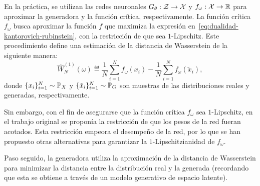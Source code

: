 {{En la práctica, se utilizan las redes neuronales $G_\theta: \mathcal{Z} \to \mathcal{X}$ y $f_\omega: \mathcal{X} \to \mathbb{R}$ para aproximar la generadora y la función crítica, respectivamente. La función crítica $f_\omega$ busca aproximar la función $f$ que maximiza la expresión en~\eqref{eq:dualidad-kantorovich-rubinstein}, con la restricción de que sea $1$-Lipschitz. Este procedimiento define una estimación de la distancia de Wasserstein de la siguiente manera:
\begin{equation}\label{eq:wasserstein-estimation}
    \widehat W_N^{(1)} (
    \omega
    ) \eqdef
    \frac{1}{N}\sum_{i=1}^{N} f_\omega(x_i) - \frac{1}{N}\sum_{i=1}^{N} f_\omega(\tilde x_i),
\end{equation}
donde $\{x_i\}_{i=1}^{N} \sim \Prob_X$ y $\{\tilde x_i\}_{i=1}^{N} \sim \Prob_G$ son muestras de las distribuciones reales y generadas, respectivamente.


Sin embargo, con el fin de asegurarse que la función crítica $f_\omega$ sea $1$-Lipschitz, en el trabajo original se proponía la restricción de que los pesos de la red fueran acotados. Esta restricción empeora el desempeño de la red, por lo que se han propuesto otras alternativas para garantizar la $1$-Lipschitzianidad de $f_\omega$.

Paso seguido, la generadora utiliza la aproximación de la distancia de Wasserstein para minimizar la distancia entre la distribución real y la generada (recordando que esta se obtiene a través de un modelo generativo de espacio latente).

}}
